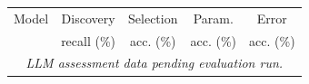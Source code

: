     \begin{tabular}{@{}lcccc@{}}
        \toprule
        Model & Discovery & Selection & Param. & Error \\
        & recall (\%) & acc. (\%) & acc. (\%) & acc. (\%) \\
        \midrule
        \multicolumn{5}{c}{\emph{LLM assessment data pending evaluation run.}} \\
        \bottomrule
    \end{tabular}
